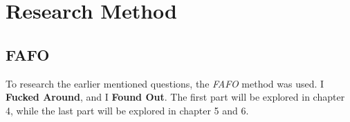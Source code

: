 \chapter{Research Method}

\section{FAFO}

To research the earlier mentioned questions, the \textit{FAFO} method was used.
I \textbf{Fucked Around}, and I \textbf{Found Out}. The first part will be explored in chapter 4,
while the last part will be explored in chapter 5 and 6.

